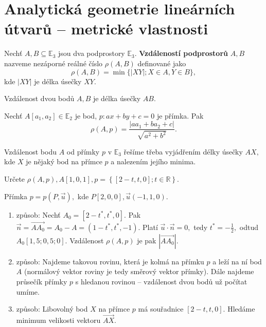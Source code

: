 \section{Analytická geometrie lineárních útvarů -- metrické vlastnosti}
\begin{definition}
    Nechť $A,B \subseteq \mathbb E_3$ jsou dva podprostory $\mathbb E_3$. \textbf{Vzdáleností
    podprostorů} $A,B$ nazveme nezáporné reálné číslo $\rho(A,B)$ definované jako
    $$\rho(A,B) = \min \{ |XY|; X\in A, Y\in B \},$$
    kde $|XY|$ je délka úsečky $XY.$
\end{definition}

\begin{veta}
    Vzdálenost dvou bodů $A,B$ je délka úsečky $AB.$
\end{veta}

\begin{veta}\label{bodpr}
    Nechť $A[a_1,a_2]\in \mathbb E_2$ je bod, $p\colon ax+by+c=0$ je přímka. Pak
    $$\rho(A,p)=\frac{|aa_1+ba_2+c|}{\sqrt{a^2+b^2} }.$$
\end{veta}

\begin{pozn}
    Vzdálenost bodu $A$ od přímky $p$ v $\mathbb E_3$ řešíme třeba vyjádřením délky úsečky
    $AX,$ kde $X$ je nějaký bod na přímce $p$ a nalezením jejího minima.
\end{pozn}

\begin{priklad}\label{primkaabod}
Určete $\rho(A,p), A[1,0,1], p=\left \{ [2-t,t,0]; t \in \mathbb R \right \} $.
\end{priklad}

\begin{reseni}
Přímka $p=p(P,\vec u), $ kde $P[2,0,0],\vec u(-1,1,0).$
\begin{enumerate}[1.]
\item způsob: Nechť $A_0=[2-t^*,t^*,0]$. Pak $\vec n = \overrightarrow{AA_0}=A_0-A=(1-t^*,t^*,-1).$
Platí $\vec u\cdot\vec n=0,$ tedy $t^*=-\frac{1}{2},$ odtud $A_0[1{,}5;0{,}5;0].$ Vzdálenost
$\rho(A,p)$ je pak $\left |\overrightarrow{AA_0}\right |.$
\item způsob: Najdeme takovou rovinu, která je kolmá na přímku $p$ a leží na ní bod $A$
(normálový vektor roviny je tedy směrový vektor přímky). Dále najdeme průsečík přímky
$p$ s hledanou rovinou -- vzdálenost dvou bodů už počítat umíme.
\item způsob: Libovolný bod $X$ na přímce $p$ má souřadnice $[2-t,t,0]$. Hledáme
minimum velikosti vektoru $\overrightarrow{AX}.$
\end{enumerate}
\end{reseni}

